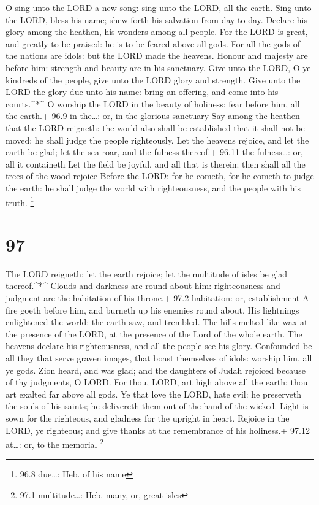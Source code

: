  O sing unto the LORD a new song: sing unto the LORD, all
the earth.  Sing unto the LORD, bless his name; shew forth
his salvation from day to day.  Declare his glory among the
heathen, his wonders among all people.  For the LORD is
great, and greatly to be praised: he is to be feared above all gods.
 For all the gods of the nations are idols: but the LORD
made the heavens.  Honour and majesty are before him:
strength and beauty are in his sanctuary.  Give unto the
LORD, O ye kindreds of the people, give unto the LORD glory and
strength.  Give unto the LORD the glory due unto his name:
bring an offering, and come into his courts.\^{}*\^{}  O
worship the LORD in the beauty of holiness: fear before him, all the
earth.+ 96.9 in the\ldots: or, in the glorious sanctuary 
Say among the heathen that the LORD reigneth: the world also shall be
established that it shall not be moved: he shall judge the people
righteously.  Let the heavens rejoice, and let the earth be
glad; let the sea roar, and the fulness thereof.+ 96.11 the
fulness\ldots: or, all it containeth  Let the field be
joyful, and all that is therein: then shall all the trees of the wood
rejoice  Before the LORD: for he cometh, for he cometh to
judge the earth: he shall judge the world with righteousness, and the
people with his truth. \footnote{96.8 due\ldots: Heb. of his name}

\hypertarget{section-96}{%
\section{97}\label{section-96}}

 The LORD reigneth; let the earth rejoice; let the multitude
of isles be glad thereof.\^{}*\^{}  Clouds and darkness are
round about him: righteousness and judgment are the habitation of his
throne.+ 97.2 habitation: or, establishment  A fire goeth
before him, and burneth up his enemies round about.  His
lightnings enlightened the world: the earth saw, and trembled.
 The hills melted like wax at the presence of the LORD, at
the presence of the Lord of the whole earth.  The heavens
declare his righteousness, and all the people see his glory.
 Confounded be all they that serve graven images, that boast
themselves of idols: worship him, all ye gods.  Zion heard,
and was glad; and the daughters of Judah rejoiced because of thy
judgments, O LORD.  For thou, LORD, art high above all the
earth: thou art exalted far above all gods.  Ye that love
the LORD, hate evil: he preserveth the souls of his saints; he
delivereth them out of the hand of the wicked.  Light is
sown for the righteous, and gladness for the upright in heart.
 Rejoice in the LORD, ye righteous; and give thanks at the
remembrance of his holiness.+ 97.12 at\ldots: or, to the memorial
\footnote{97.1 multitude\ldots: Heb. many, or, great isles}

